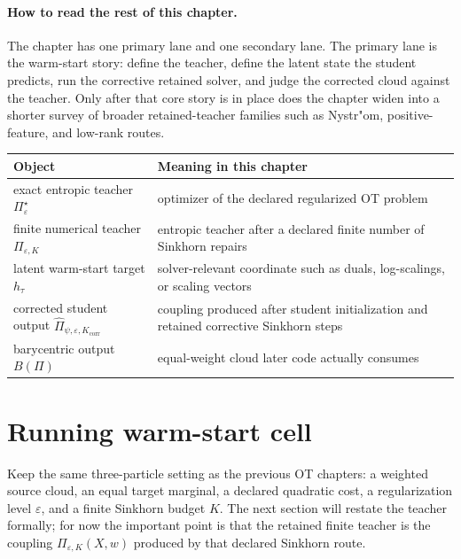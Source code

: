 \paragraph{How to read the rest of this chapter.}
The chapter has one primary lane and one secondary lane.  The primary lane is the
warm-start story: define the teacher, define the latent state the student predicts,
run the corrective retained solver, and judge the corrected cloud against the
teacher.  Only after that core story is in place does the chapter widen into a
shorter survey of broader retained-teacher families such as Nystr"om,
positive-feature, and low-rank routes.

\begin{center}
\small
\begin{tabular}{p{} p{}}
\toprule
Object & Meaning in this chapter \\
\midrule
exact entropic teacher \(\Pi_\varepsilon^\star\) & optimizer of the declared regularized OT problem \\
finite numerical teacher \(\Pi_{\varepsilon,K}\) & entropic teacher after a declared finite number of Sinkhorn repairs \\
latent warm-start target \(h_\tau\) & solver-relevant coordinate such as duals, log-scalings, or scaling vectors \\
corrected student output \(\widehat\Pi_{\psi,\varepsilon,K_{\mathrm{corr}}}\) & coupling produced after student initialization and retained corrective Sinkhorn steps \\
barycentric output \(B(\Pi)\) & equal-weight cloud later code actually consumes \\
\bottomrule
\end{tabular}
\end{center}

\section{Running warm-start cell}
\label{sec:bf-learned-ot-running-cell}

Keep the same three-particle setting as the previous OT chapters: a weighted
source cloud, an equal target marginal, a declared quadratic cost, a
regularization level \(\varepsilon\), and a finite Sinkhorn budget \(K\).  The
next section will restate the teacher formally; for now the important point is
that the retained finite teacher is the coupling
\(\Pi_{\varepsilon,K}(X,w)\) produced by that declared Sinkhorn route.

